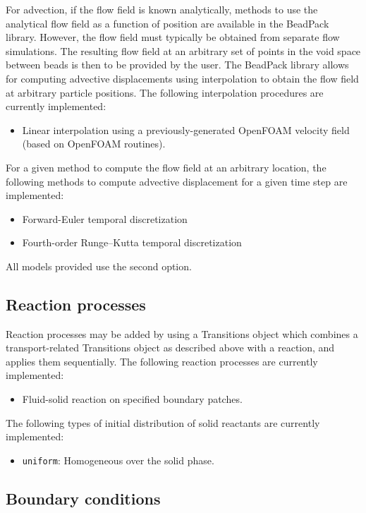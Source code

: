 \documentclass[11pt]{article}
\begin{document}
For advection, if the flow field is known analytically, methods to use the analytical flow field as a function of position are available in the BeadPack library. However, the flow field must typically be obtained from separate flow simulations. The resulting flow field at an arbitrary set of points in the void space between beads is then to be provided by the user. The BeadPack library allows for computing advective displacements using interpolation to obtain the flow field at arbitrary particle positions. The following interpolation procedures are currently implemented:
%
\begin{itemize}
\item Linear interpolation using a previously-generated OpenFOAM velocity field (based on OpenFOAM routines).
\end{itemize}
For a given method to compute the flow field at an arbitrary location, the following methods to compute advective displacement for a given time step are implemented:
%
\begin{itemize}
\item Forward-Euler temporal discretization
\item Fourth-order Runge--Kutta temporal discretization
\end{itemize}
All models provided use the second option.

\subsection{Reaction processes}

Reaction processes may be added by using a Transitions object which combines a transport-related Transitions object as described above with a reaction, and applies them sequentially. The following reaction processes are currently implemented:
%
\begin{itemize}
\item Fluid-solid reaction on specified boundary patches.
\end{itemize}

The following types of initial distribution of solid reactants are currently implemented:
%
\begin{itemize}
\item \lstinline{uniform}: Homogeneous over the solid phase.
\end{itemize}

\subsection{Boundary conditions}
\end{document}
